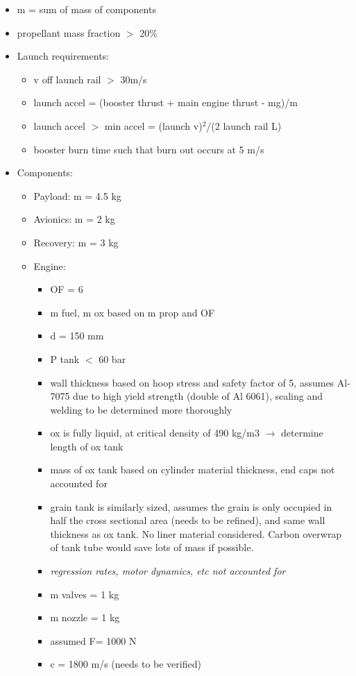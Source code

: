 \documentclass[12pt]{article}
\begin{document}
\begin{itemize}
\item m = sum of mass of components
\item propellant mass fraction $>$ 20\%
\item Launch requirements:
\begin{itemize}
\item v off launch rail $>$ 30m/s
\item launch accel = (booster thrust + main engine thrust - mg)/m 
\item launch accel $>$ min accel = (launch v)$^2$/(2 launch rail L)
\item booster burn time such that burn out occurs at 5 m/s
\end{itemize}
\item Components:
\begin{itemize}
\item Payload: m = 4.5 kg
\item Avionics: m = 2 kg
\item Recovery: m = 3 kg
\item Engine: 
\begin{itemize}
\item OF = 6
\item m fuel, m ox based on m prop and OF
\item d = 150 mm
\item P tank $<$ 60 bar
\item wall thickness based on hoop stress and safety factor of 5, assumes Al-7075 due to high yield strength (double of Al 6061), sealing and welding to be determined more thoroughly
\item ox is fully liquid, at critical density of 490 kg/m3 $\rightarrow$ determine length of ox tank
\item mass of ox tank based on cylinder material thickness, end caps not accounted for
\item grain tank is similarly sized, assumes the grain is only occupied in half the cross sectional area (needs to be refined), and same wall thickness as ox tank. No liner material considered. Carbon overwrap of tank tube would save lots of mass if possible. 
\item \emph{regression rates, motor dynamics, etc not accounted for}
\item m valves = 1 kg
\item m nozzle = 1 kg
\item assumed F= 1000 N
\item c = 1800 m/s (needs to be verified)

\end{itemize}
\end{itemize}
\end{itemize}
\end{document}
